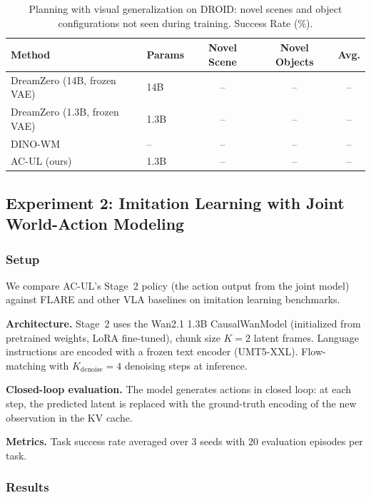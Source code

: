 \documentclass{article}
\begin{document}
\begin{table}[t]
\centering
\caption{Planning with visual generalization on DROID: novel scenes and object configurations not seen during training. Success Rate (\%).}
\label{tab:planning_generalization}
\begin{tabular}{llccc}
\toprule
\textbf{Method} & \textbf{Params} & \textbf{Novel Scene} & \textbf{Novel Objects} & \textbf{Avg.} \\
\midrule
DreamZero (14B, frozen VAE)   & 14B  & -- & -- & -- \\
DreamZero (1.3B, frozen VAE)  & 1.3B & -- & -- & -- \\
DINO-WM                       & --   & -- & -- & -- \\
\midrule
AC-UL (ours)                  & 1.3B & -- & -- & -- \\
\bottomrule
\end{tabular}
\end{table}

\subsection{Experiment 2: Imitation Learning with Joint World-Action Modeling}
\label{sec:exp_imitation}

\subsubsection{Setup}

We compare AC-UL's Stage~2 policy (the action output from the joint model) against FLARE and other VLA baselines on imitation learning benchmarks.

\textbf{Architecture.}
Stage~2 uses the Wan2.1 1.3B CausalWanModel (initialized from pretrained weights, LoRA fine-tuned), chunk size $K = 2$ latent frames. Language instructions are encoded with a frozen text encoder (UMT5-XXL). Flow-matching with $K_{\text{denoise}} = 4$ denoising steps at inference.

\textbf{Closed-loop evaluation.}
The model generates actions in closed loop: at each step, the predicted latent is replaced with the ground-truth encoding of the new observation in the KV cache.

\textbf{Metrics.}
Task success rate averaged over 3 seeds with 20 evaluation episodes per task.

\subsubsection{Results}
\end{document}
